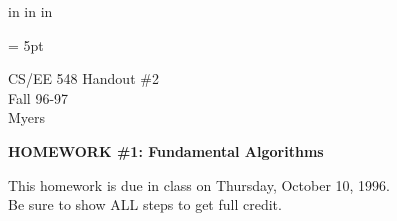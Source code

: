  in
 in
 in
\textwidth 6.5in
\oddsidemargin -0.2in
\evensidemargin -0.4in
\renewcommand{\textfraction}{0.05}
\renewcommand{\topfraction}{0.9}
\renewcommand{\dbltopfraction}{0.9}
\renewcommand{\bottomfraction}{0.9}
\renewcommand{\floatpagefraction}{0.9}
\renewcommand{\dblfloatpagefraction}{0.9}
\setcounter{topnumber}{3}
\setcounter{bottomnumber}{3}

\baselineskip=12pt
\parskip = 5pt
\pagestyle{empty}

\noindent
CS/EE 548 \hfill Handout \#2 \\
Fall 96-97 \hfill \\
Myers\hfill \\

\centerline{\Large\bf HOMEWORK \#1: Fundamental Algorithms}

\vspace*{0.4in}

\noindent
This homework is due in class on Thursday, October 10, 1996. \\
Be sure to show ALL steps to get full credit. 

